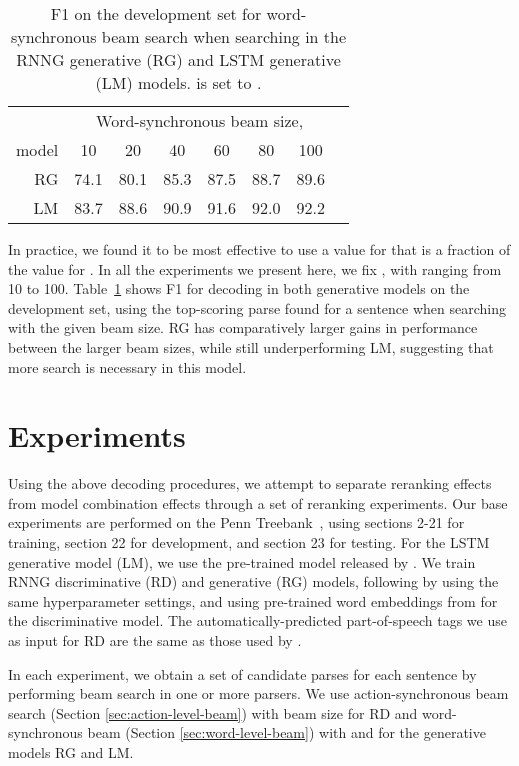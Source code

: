 \documentclass[11pt,a4paper]{article}
\newcommand{\lstm}{\textsc{LM}\xspace}
\newcommand{\rnngg}{\textsc{RG}\xspace}
\begin{document}
\begin{table}
\centering
\begin{tabular}{r|ccccccc}
& \multicolumn{6}{c}{Word-synchronous beam size, } \\
model &  10 & 20 & 40 & 60 & 80 & 100 \\
\hline
\rnngg & 74.1 & 80.1 & 85.3 & 87.5 & 88.7 & 89.6\\
\lstm & 83.7 & 88.6 & 90.9 & 91.6 & 92.0 & 92.2 \\
\end{tabular}
\caption{\label{tab:beam_size}F1 on the development set for word-synchronous beam search when searching in the RNNG generative (RG) and LSTM generative (LM) models.  is set to .}
\vspace{-1em}
\end{table}

In practice, we found it to be most effective to use a value for  that is a fraction of the value for . In all the experiments we present here, we fix , with  ranging from 10 to 100.
Table~\ref{tab:beam_size} shows F1 for decoding in both generative models on the development set, using the top-scoring parse found for a sentence when searching with the given beam size. RG has comparatively larger gains in performance between the larger beam sizes, while still underperforming LM, suggesting that more search is necessary in this model.

\section{Experiments}

Using the above decoding procedures, we attempt to separate reranking effects from model combination effects through a set of reranking experiments. Our base experiments are performed on the Penn Treebank~\cite{marcus1993building}, using sections \mbox{2-21} for training, section 22 for development, and section 23 for testing. For the LSTM generative model (LM), we use the pre-trained model released by \citet{Choe16Parsing}. We train RNNG discriminative (RD) and generative (RG) models, following \citet{dyer2016recurrent} by using the same hyperparameter settings, and using pre-trained word embeddings from \citet{ling2015two} for the discriminative model. The automatically-predicted part-of-speech tags we use as input for RD are the same as those used by \citet{Cross16Span}.

In each experiment, we obtain a set of candidate parses for each sentence by performing beam search in one or more parsers. We use  action-synchronous beam search (Section \ref{sec:action-level-beam}) with beam size  for RD and word-synchronous beam (Section \ref{sec:word-level-beam}) with  and  for the generative models RG and LM. 
\end{document}
